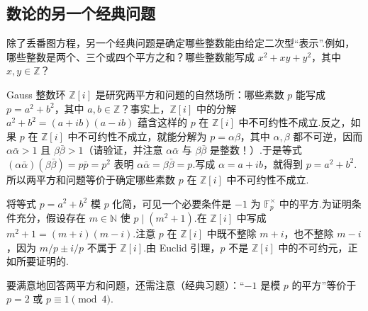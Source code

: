 \subsection{数论的另一个经典问题}\label{sec:galois-1-1-4}
除了丢番图方程，另一个经典问题是确定哪些整数能由给定二次型``表示''.例如，哪些整数是两个、三个或四个平方之和？哪些整数能写成 $x^2+xy+y^2$，其中 $x,y\in\mathbb Z$？
\begin{example*}
Gauss 整数环 $\mathbb Z[i]$ 是研究两平方和问题的自然场所：哪些素数 $p$ 能写成 $p=a^2+b^2$，其中 $a,b\in\mathbb Z$？事实上，$\mathbb Z[i]$ 中的分解 $a^2+b^2=(a+ib)(a-ib)$ 蕴含这样的 $p$ 在 $\mathbb Z[i]$ 中不可约性不成立.反之，如果 $p$ 在 $\mathbb Z[i]$ 中不可约性不成立，就能分解为 $p=\alpha\beta$，其中 $\alpha,\beta$ 都不可逆，因而 $\alpha\bar\alpha>1$ 且 $\beta\bar\beta>1$（请验证，并注意 $\alpha\bar\alpha$ 与 $\beta\bar\beta$ 是整数！）.于是等式 $(\alpha\bar\alpha)(\beta\bar\beta)=p\bar p=p^2$ 表明 $\alpha\bar\alpha=\beta\bar\beta=p$.写成 $\alpha=a+ib$，就得到 $p=a^2+b^2$.所以两平方和问题等价于确定哪些素数 $p$ 在 $\mathbb Z[i]$ 中不可约性不成立.

将等式 $p=a^2+b^2$ 模 $p$ 化简，可见一个必要条件是 $-1$ 为 $\mathbb F_p^\times$ 中的平方.为证明条件充分，假设存在 $m\in\mathbb N$ 使 $p\mid(m^2+1)$.在 $\mathbb Z[i]$ 中写成 $m^2+1=(m+i)(m-i)$.注意 $p$ 在 $\mathbb Z[i]$ 中既不整除 $m+i$，也不整除 $m-i$，因为 $m/p\pm i/p$ 不属于 $\mathbb Z[i]$.由 Euclid 引理，$p$ 不是 $\mathbb Z[i]$ 中的不可约元，正如所要证明的.
\end{example*}
\begin{remark*}
要满意地回答两平方和问题，还需注意（经典习题）：``$-1$ 是模 $p$ 的平方''等价于 $p=2$ 或 $p\equiv1\pmod4$.
\end{remark*}
